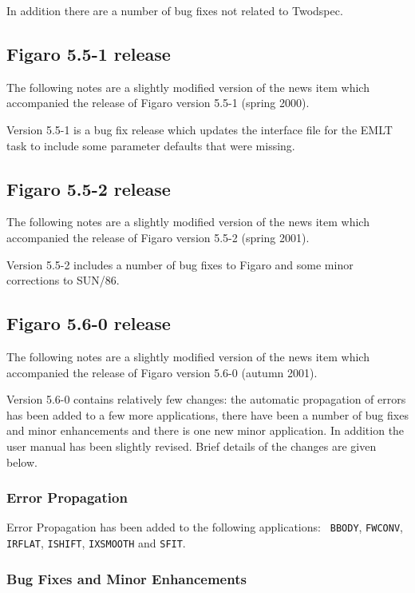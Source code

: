  In addition there are a number of bug fixes not related to Twodspec.

\subsection{\label{news551}Figaro 5.5-1 release}

 The following notes are a slightly modified version of the news item
 which accompanied the release of Figaro version 5.5-1 (spring 2000).

 Version 5.5-1 is a bug fix release which updates the interface file for
 the EMLT task to include some parameter defaults that were missing.

\subsection{\label{news552}Figaro 5.5-2 release}

 The following notes are a slightly modified version of the news item
 which accompanied the release of Figaro version 5.5-2 (spring 2001).

 Version 5.5-2 includes a number of bug fixes to Figaro and some minor
 corrections to SUN/86.

\subsection{\label{news560}Figaro 5.6-0 release}

 The following notes are a slightly modified version of the news item
 which accompanied the release of Figaro version 5.6-0 (autumn 2001).

 Version 5.6-0 contains relatively few changes: the automatic propagation
 of errors has been added to a few more applications, there have been a
 number of bug fixes and minor enhancements and there is one new minor
 application.  In addition the user manual has been slightly revised.
 Brief details of the changes are given below.

\subsubsection{Error Propagation}

 Error Propagation has been added to the following applications: {\tt
 BBODY}, {\tt FWCONV}, {\tt IRFLAT}, {\tt ISHIFT}, {\tt IXSMOOTH} and
 {\tt SFIT}.

\subsubsection{Bug Fixes and Minor Enhancements}

